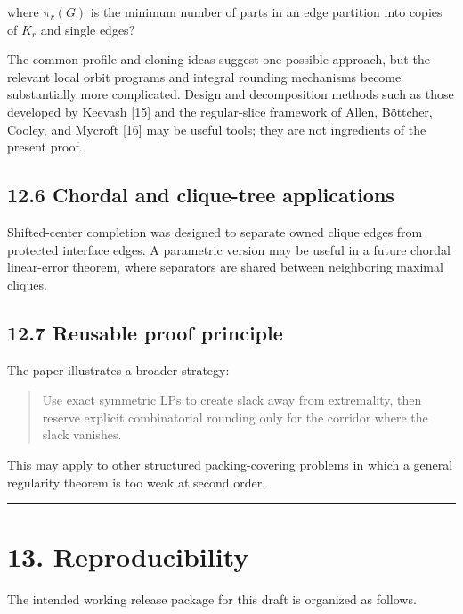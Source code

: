 \documentclass[
  11pt,
]{article}
\begin{document}
where \(\pi_r(G)\) is the minimum number of parts in an edge partition into copies of \(K_r\) and single edges?

The common-profile and cloning ideas suggest one possible approach, but the relevant local orbit programs and integral rounding mechanisms become substantially more complicated. Design and decomposition methods such as those developed by Keevash {[}15{]} and the regular-slice framework of Allen, Böttcher, Cooley, and Mycroft {[}16{]} may be useful tools; they are not ingredients of the present proof.

\subsection{12.6 Chordal and clique-tree applications}\label{chordal-and-clique-tree-applications}

Shifted-center completion was designed to separate owned clique edges from protected interface edges. A parametric version may be useful in a future chordal linear-error theorem, where separators are shared between neighboring maximal cliques.

\subsection{12.7 Reusable proof principle}\label{reusable-proof-principle}

The paper illustrates a broader strategy:

\begin{quote}
Use exact symmetric LPs to create slack away from extremality, then reserve explicit combinatorial rounding only for the corridor where the slack vanishes.
\end{quote}

This may apply to other structured packing-covering problems in which a general regularity theorem is too weak at second order.

\begin{center}\rule{0.5\linewidth}{0.5pt}\end{center}

\section{13. Reproducibility}\label{reproducibility}

The intended working release package for this draft is organized as follows.
\end{document}
